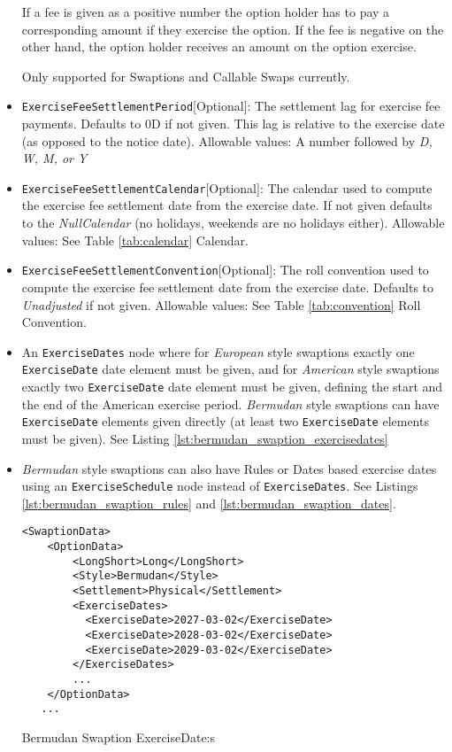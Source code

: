 \begin{itemize}
  If a fee is given as a positive number the option holder has to pay a corresponding amount if they exercise the
  option. If the fee is negative on the other hand, the option holder receives an amount on the option exercise.

  Only supported for Swaptions and Callable Swaps currently.

\item \lstinline!ExerciseFeeSettlementPeriod![Optional]: The settlement lag for exercise fee payments. Defaults to 0D if not
  given. This lag is relative to the exercise date (as opposed to the notice date). Allowable values: A number followed by \emph{D, W, M, or Y}

\item \lstinline!ExerciseFeeSettlementCalendar![Optional]: The calendar used to compute the exercise fee settlement date from the
  exercise date. If not given defaults to the \emph{NullCalendar} (no holidays, weekends are no holidays either). Allowable values: See Table \ref{tab:calendar} Calendar.

\item \lstinline!ExerciseFeeSettlementConvention![Optional]: The roll convention used to compute the exercise fee settlement date from
  the exercise date. Defaults to \emph{Unadjusted} if not given. Allowable values: See Table \ref{tab:convention} Roll Convention.

\item An \lstinline!ExerciseDates! node where for \emph{European} style swaptions exactly one \lstinline!ExerciseDate! date element must be given, and for \emph{American} style swaptions  exactly two \lstinline!ExerciseDate! date element must be given, defining the start and the end of the American exercise period.  \emph{Bermudan} style swaptions can have \lstinline!ExerciseDate! elements given directly (at least two  \lstinline!ExerciseDate! elements must be given). See Listing \ref{lst:bermudan_swaption_exercisedates}

\item  \emph{Bermudan} style swaptions can also have Rules or Dates based exercise dates using an  \lstinline!ExerciseSchedule! node instead of  \lstinline!ExerciseDates!. See Listings \ref{lst:bermudan_swaption_rules} and \ref{lst:bermudan_swaption_dates}.


\begin{listing}[H]
\begin{verbatim}
<SwaptionData>
    <OptionData>
        <LongShort>Long</LongShort>
        <Style>Bermudan</Style>
        <Settlement>Physical</Settlement>
        <ExerciseDates>
          <ExerciseDate>2027-03-02</ExerciseDate>
          <ExerciseDate>2028-03-02</ExerciseDate>
          <ExerciseDate>2029-03-02</ExerciseDate>
        </ExerciseDates>
        ...
    </OptionData>
   ...
\end{verbatim}
\caption{Bermudan Swaption ExerciseDate:s}
\label{lst:bermudan_swaption_exercisedates}
\end{listing}


\end{itemize}
